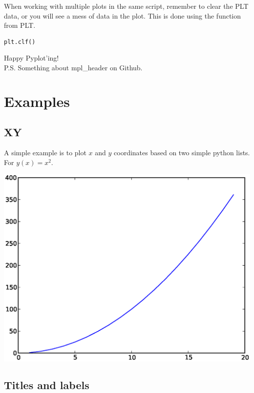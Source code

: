\documentclass{article}
\begin{document}
When working with multiple plots in the same script, remember to clear the PLT data, or you will see a mess of data in the plot. This is done using the  function from PLT.

\begin{lstlisting}
plt.clf()
\end{lstlisting}

Happy Pyplot'ing!\\


P.S. Something about mpl\_header on Github.


\newpage
\section{Examples}

\subsection{XY}

A simple example is to plot $x$ and $y$ coordinates based on two simple python lists.
For $y(x) = x^2$.

\begin{multicols}{2}

    

\columnbreak

    \includegraphics[width=1.0\linewidth]{py/figure_xy.eps}

\end{multicols}


\newpage
\subsection{Titles and labels}
\end{document}
